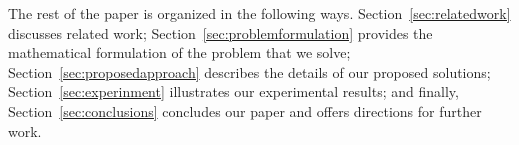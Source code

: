 The rest of the paper is organized in the following ways. Section~\ref{sec:relatedwork} discusses related work; Section~\ref{sec:problemformulation} provides the mathematical formulation of the problem that we solve; Section~\ref{sec:proposedapproach} describes the details of our proposed solutions; Section~\ref{sec:experinment} illustrates our experimental results; and finally, Section~\ref{sec:conclusions} concludes our paper and offers directions for further work.


